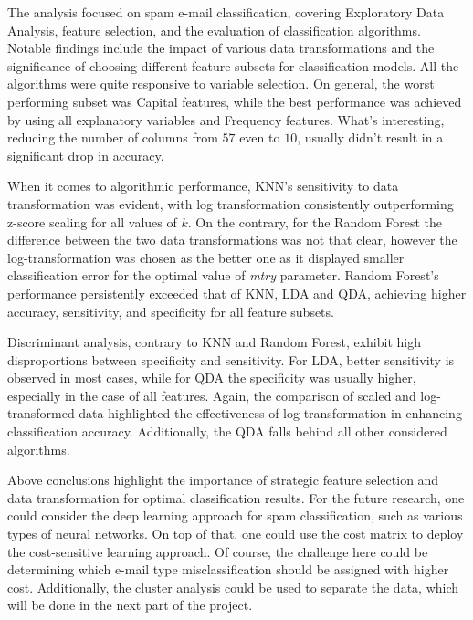 \documentclass{article}\usepackage[]{graphicx}\usepackage[]{xcolor}
\begin{document}
The analysis focused on spam e-mail classification, covering Exploratory Data Analysis, 
feature selection, and the evaluation of classification algorithms.
Notable findings include the impact of various data transformations and the 
significance of choosing different feature subsets for classification models.
All the algorithms were quite responsive to variable selection. On general, 
the worst performing subset was Capital features, while the best performance was
achieved by using all explanatory variables and Frequency features.
What's interesting, reducing the number of columns from $57$ even to $10$, usually
didn't result in a significant drop in accuracy. 

When it comes to algorithmic performance, KNN's sensitivity to data transformation 
was evident, with log transformation consistently outperforming z-score scaling for all values of $k$. 
On the contrary, for the Random Forest the difference between the two data transformations
was not that clear, however the log-transformation was chosen as the better one as it
displayed smaller classification error for the optimal value of \textit{mtry} parameter.
Random Forest's performance persistently exceeded that of KNN, LDA and QDA, achieving higher accuracy, 
sensitivity, and specificity for all feature subsets.

Discriminant analysis, contrary to KNN and Random Forest, exhibit high disproportions 
between specificity and sensitivity. For LDA, better sensitivity is observed in 
most cases, while for QDA the specificity was usually higher, especially in the 
case of all features. Again, the comparison of scaled and log-transformed data 
highlighted the effectiveness of log transformation in enhancing classification accuracy.
Additionally, the QDA falls behind all other considered algorithms.

Above conclusions highlight the importance of strategic feature selection and data 
transformation for optimal classification results. For the future research, one
could consider the deep learning approach for spam classification, such as various
types of neural networks. On top of that, one could use the cost matrix to deploy
the cost-sensitive learning approach. Of course, the challenge here could be 
determining which e-mail type misclassification should be assigned with higher cost.
Additionally, the cluster analysis could be used to separate the data, which
will be done in the next part of the project.
\end{document}
